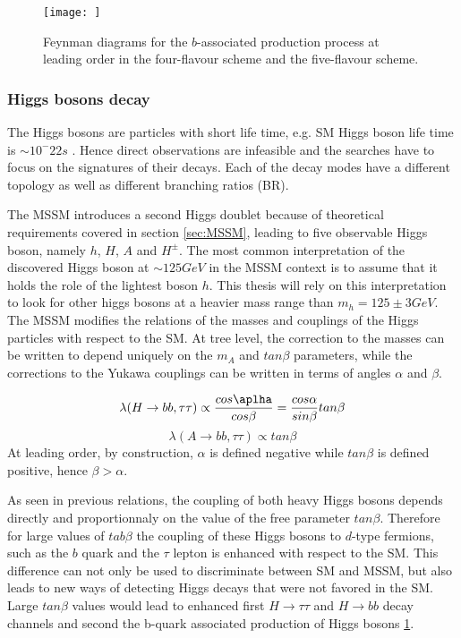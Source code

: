 \begin{figure}
    \centering
    \texttt{[image: ]}
    \caption{Feynman diagrams for the $b$-associated production process at leading order in the four-flavour scheme and the five-flavour scheme.}
    \label{fig:bbh}
\end{figure}

\subsubsection{Higgs bosons decay}

The Higgs bosons are particles with short life time, e.g. SM Higgs boson life time is $\sim 10^-22 s$ \cite{pdg2016}. Hence direct observations are infeasible and the searches have to focus on the signatures of their decays. Each of the decay modes have a different topology as well as different branching ratios (BR). 

The MSSM introduces a second Higgs doublet because of theoretical requirements covered in section \ref{sec:MSSM}, leading to five observable Higgs boson, namely $h$, $H$, $A$ and $H^{\pm}$. The most common interpretation of the discovered Higgs boson at $\sim 125 GeV$ in the MSSM context is to assume that it holds the role of the lightest boson $h$. This thesis will rely on this interpretation to look for other higgs bosons at a heavier mass range than $m_h = 125 \pm 3 GeV$. The MSSM modifies the relations of the masses and couplings of the Higgs particles with respect to the SM. At tree level, the correction to the masses can be written to depend uniquely on the $m_A$ and $tan \beta$ parameters, while the corrections to the Yukawa couplings can be written in terms of angles $\alpha$ and $\beta$.

\begin{equation}
    \lambda(H \rightarrow bb, \tau\tau) \propto \frac{cos \aplha}{cos \beta} = \frac{cos \alpha}{sin \beta} tan \beta
\end{equation}
\begin{equation}
    \lambda(A \rightarrow bb, \tau\tau) \propto tan \beta
\end{equation}
At leading order, by construction, $\alpha$ is defined negative while $tan \beta$ is defined positive, hence $\beta > \alpha$.

As seen in previous relations, the coupling of both heavy Higgs bosons depends directly and proportionnaly on the value of the free parameter $tan \beta$. Therefore for large values of $tab \beta$ the coupling of these Higgs bosons to $d$-type fermions, such as the $b$ quark and the $\tau$ lepton is enhanced with respect to the SM. This difference can not only be used to discriminate between SM and MSSM, but also leads to new ways of detecting Higgs decays that were not favored in the SM. Large $tan \beta$ values would lead to enhanced first $H \rightarrow \tau\tau$ and $H \rightarrow bb$ decay channels and second the b-quark associated production of Higgs bosons \ref{fig:bbh}.

